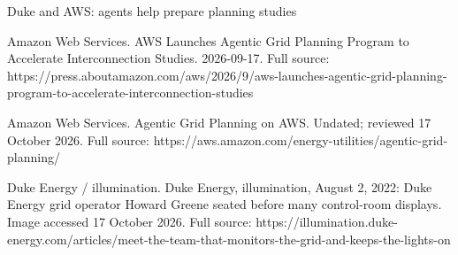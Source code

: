 \begin{frame}[t]{Duke and AWS: agents help prepare planning studies}
{Amazon Web Services. AWS Launches Agentic Grid Planning Program to Accelerate Interconnection Studies. 2026-09-17.
Full source: https://press.aboutamazon.com/aws/2026/9/aws-launches-agentic-grid-planning-program-to-accelerate-interconnection-studies

Amazon Web Services. Agentic Grid Planning on AWS. Undated; reviewed 17 October 2026.
Full source: https://aws.amazon.com/energy-utilities/agentic-grid-planning/

Duke Energy / illumination. Duke Energy, illumination, August 2, 2022: Duke Energy grid operator Howard Greene seated before many control-room displays. Image accessed 17 October 2026.
Full source: https://illumination.duke-energy.com/articles/meet-the-team-that-monitors-the-grid-and-keeps-the-lights-on}
\end{frame}


